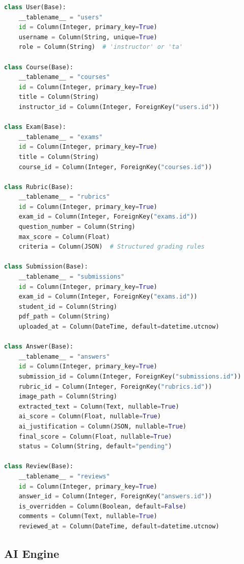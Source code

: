 \documentclass[11pt,a4paper]{article}
\begin{document}
\begin{lstlisting}[language=Python, caption={SQLAlchemy ORM model definitions}]
class User(Base):
    __tablename__ = "users"
    id = Column(Integer, primary_key=True)
    username = Column(String, unique=True)
    role = Column(String)  # 'instructor' or 'ta'

class Course(Base):
    __tablename__ = "courses"
    id = Column(Integer, primary_key=True)
    title = Column(String)
    instructor_id = Column(Integer, ForeignKey("users.id"))

class Exam(Base):
    __tablename__ = "exams"
    id = Column(Integer, primary_key=True)
    title = Column(String)
    course_id = Column(Integer, ForeignKey("courses.id"))

class Rubric(Base):
    __tablename__ = "rubrics"
    id = Column(Integer, primary_key=True)
    exam_id = Column(Integer, ForeignKey("exams.id"))
    question_number = Column(String)
    max_score = Column(Float)
    criteria = Column(JSON)  # Structured grading rules

class Submission(Base):
    __tablename__ = "submissions"
    id = Column(Integer, primary_key=True)
    exam_id = Column(Integer, ForeignKey("exams.id"))
    student_id = Column(String)
    pdf_path = Column(String)
    uploaded_at = Column(DateTime, default=datetime.utcnow)

class Answer(Base):
    __tablename__ = "answers"
    id = Column(Integer, primary_key=True)
    submission_id = Column(Integer, ForeignKey("submissions.id"))
    rubric_id = Column(Integer, ForeignKey("rubrics.id"))
    image_path = Column(String)
    extracted_text = Column(Text, nullable=True)
    ai_score = Column(Float, nullable=True)
    ai_justification = Column(JSON, nullable=True)
    final_score = Column(Float, nullable=True)
    status = Column(String, default="pending")

class Review(Base):
    __tablename__ = "reviews"
    id = Column(Integer, primary_key=True)
    answer_id = Column(Integer, ForeignKey("answers.id"))
    is_overridden = Column(Boolean, default=False)
    comments = Column(Text, nullable=True)
    reviewed_at = Column(DateTime, default=datetime.utcnow)
\end{lstlisting}

\subsection{AI Engine}
\label{subsec:ai-engine}
\end{document}
